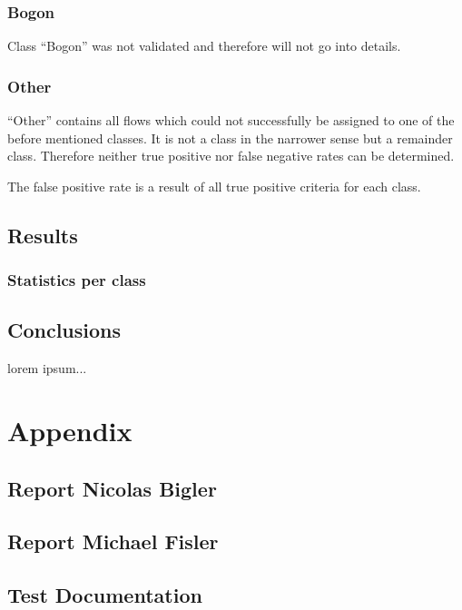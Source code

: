 \documentclass[a4paper]{scrartcl}
\begin{document}
\subsubsection{Bogon}
Class ``Bogon'' was not validated and therefore will not go into details.

\subsubsection{Other}
``Other'' contains all flows which could not successfully be assigned to one of the before mentioned classes. It is not a class in the narrower sense but a remainder class. Therefore neither true positive nor false negative rates can be determined.

The false positive rate is a result of all true positive criteria for each class.


\subsection{Results}
\subsubsection{Statistics per class}
\subsubsection{}
\subsection{Conclusions}

lorem ipsum...

\section{Appendix}

\subsection{Report Nicolas Bigler}

\subsection{Report Michael Fisler}

\subsection{Test Documentation}
\end{document}
